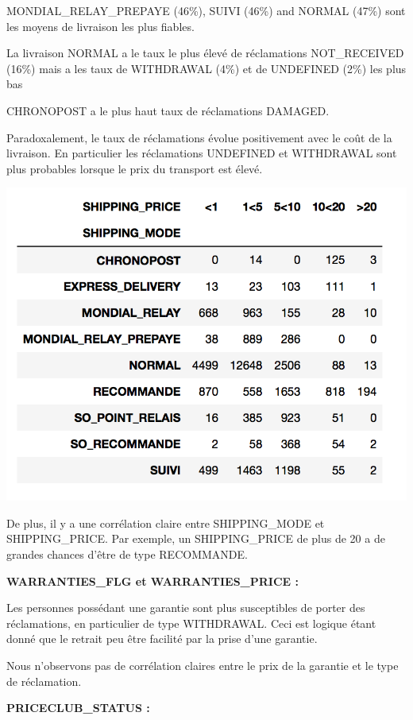 MONDIAL_RELAY_PREPAYE (46\%), SUIVI (46\%) and NORMAL (47\%) sont les moyens de livraison
les plus fiables.

La livraison NORMAL a le taux le plus élevé de réclamations NOT_RECEIVED (16\%) mais a les taux
de WITHDRAWAL (4\%) et de UNDEFINED (2\%) les plus bas

CHRONOPOST a le plus haut taux de réclamations DAMAGED.

Paradoxalement, le taux de réclamations évolue positivement avec le coût de la livraison.
En particulier les réclamations UNDEFINED et WITHDRAWAL sont plus probables lorsque
le prix du transport est élevé. 

\begin{center}
\includegraphics[scale=0.5]{assets/shipping} 
\end{center}

De plus, il y a une corrélation claire entre SHIPPING_MODE et SHIPPING_PRICE. Par exemple,
un SHIPPING_PRICE de plus de 20 a de grandes chances d'être de type RECOMMANDE.

\textbf{WARRANTIES_FLG et WARRANTIES_PRICE :}

Les personnes possédant une garantie sont plus susceptibles de porter des réclamations, en 
particulier de type WITHDRAWAL. Ceci est logique étant donné que le retrait peu être 
facilité par la prise d'une garantie.

Nous n'observons pas de corrélation claires entre le prix de la garantie et le type de
réclamation.

\textbf{PRICECLUB_STATUS :}

